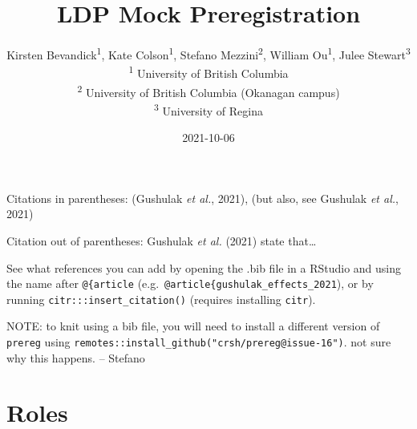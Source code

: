 \documentclass[]{article}
\title{LDP Mock Preregistration}
\author{
          Kirsten Bevandick\textsuperscript{1},
          Kate Colson\textsuperscript{1},
          Stefano Mezzini\textsuperscript{2},
          William Ou\textsuperscript{1},
          Julee Stewart\textsuperscript{3}          \\ \vspace{0.5cm}
              \textsuperscript{1} University of British Columbia\\
              \textsuperscript{2} University of British Columbia
(Okanagan campus)\\
              \textsuperscript{3} University of Regina      }
\date{2021-10-06}
\newcounter{question}
\begin{document}
\maketitle
\vspace{2pc}


\newcommand\Question[2]{%
   \leavevmode\par
   \stepcounter{question}
   \noindent
   \textbf{\thequestion. #1}. #2\par}

\newcommand\Answer[1]{%
    \noindent
    \textit{Registered response}: #1\par}

Citations in parentheses: (Gushulak \emph{et al.}, 2021), (but also, see
Gushulak \emph{et al.}, 2021)

Citation out of parentheses: Gushulak \emph{et al.} (2021) state
that\ldots{}

See what references you can add by opening the .bib file in a RStudio
and using the name after \texttt{@\{article}
(e.g.~\texttt{@article\{gushulak\_effects\_2021}), or by running
\texttt{citr:::insert\_citation()} (requires installing \texttt{citr}).

NOTE: to knit using a bib file, you will need to install a different
version of \texttt{prereg} using
\texttt{remotes::install\_github("crsh/prereg@issue-16")}. not sure why
this happens. -- Stefano

\hypertarget{roles}{%
\section{Roles}\label{roles}}
\end{document}
